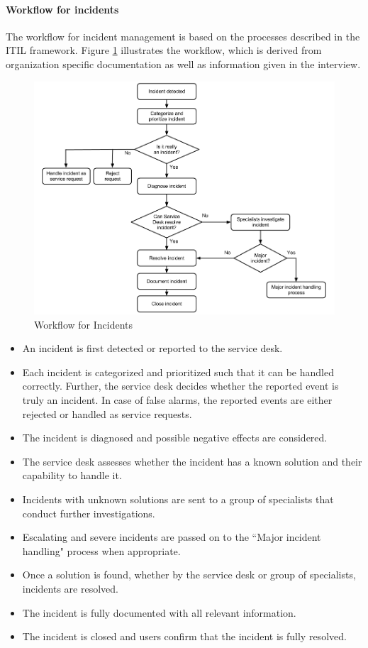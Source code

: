 \paragraph{Workflow for incidents}
The workflow for incident management is based on the processes described in the ITIL framework. Figure \ref{fig:workflowcaseC} illustrates the workflow, which is derived from organization specific documentation as well as information given in the interview. 

\begin{figure}[H]
\hspace{-1.1cm}\includegraphics[scale=0.49]{workflowcaseC.png}
\caption[Workflow for Incidents, Case C]{Workflow for Incidents}
\label{fig:workflowcaseC}
\end{figure}

\begin{itemize}
\item An incident is first detected or reported to the service desk.
\item Each incident is categorized and prioritized such that it can be handled correctly. Further, the service desk decides whether the reported event is truly an incident. In case of false alarms, the reported events are either rejected or handled as service requests.
\item The incident is diagnosed and possible negative effects are considered.
\item The service desk assesses whether the incident has a known solution and their capability to handle it.
\item Incidents with unknown solutions are sent to a group of specialists that conduct further investigations.
\item Escalating and severe incidents are passed on to the ``Major incident handling" process when appropriate. 
\item Once a solution is found, whether by the service desk or group of specialists, incidents are resolved.
\item The incident is fully documented with all relevant information.
\item The incident is closed and users confirm that the incident is fully resolved. 
\end{itemize}

